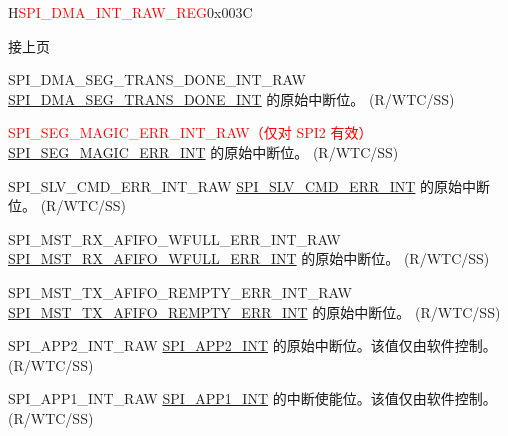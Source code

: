 \addtocounter{Regfloat}{-1}
\begin{register}{H}{\textcolor{red}{SPI\_DMA\_INT\_RAW\_REG}}{0x{}003C}
\begin{regdesc}\begin{reglist}
\item [接上页]
\label{fielddesc:SPIDMASEGTRANSDONEINTRAW}\item [SPI\_DMA\_SEG\_TRANS\_DONE\_INT\_RAW] \hyperref[int:SPIDMASEGTRANSDONEINT]{SPI\_DMA\_SEG\_TRANS\_DONE\_INT} 的原始中断位。 (R/WTC/SS)
\label{fielddesc:SPISEGMAGICERRINTRAW}\item [\textcolor{red}{SPI\_SEG\_MAGIC\_ERR\_INT\_RAW（仅对 SPI2 有效）}] \hyperref[int:SPISEGMAGICERRINT]{SPI\_SEG\_MAGIC\_ERR\_INT} 的原始中断位。 (R/WTC/SS)
\label{fielddesc:SPISLVCMDERRINTRAW}\item [SPI\_SLV\_CMD\_ERR\_INT\_RAW] \hyperref[int:SPISLVCMDERRINT]{SPI\_SLV\_CMD\_ERR\_INT} 的原始中断位。 (R/WTC/SS)
\label{fielddesc:SPIMSTRXAFIFOWFULLERRINTRAW}\item [SPI\_MST\_RX\_AFIFO\_WFULL\_ERR\_INT\_RAW] \hyperref[int:SPIMSTRXAFIFOWFULLERRINT]{SPI\_MST\_RX\_AFIFO\_WFULL\_ERR\_INT} 的原始中断位。 (R/WTC/SS)
\label{fielddesc:SPIMSTTXAFIFOREMPTYERRINTRAW}\item [SPI\_MST\_TX\_AFIFO\_REMPTY\_ERR\_INT\_RAW] \hyperref[int:SPIMSTTXAFIFOREMPTYERRINT]{SPI\_MST\_TX\_AFIFO\_REMPTY\_ERR\_INT} 的原始中断位。 (R/WTC/SS)
\label{fielddesc:SPIAPP2INTRAW}\item [SPI\_APP2\_INT\_RAW] \hyperref[int:SPIAPP2INT]{SPI\_APP2\_INT} 的原始中断位。该值仅由软件控制。 (R/WTC/SS)
\label{fielddesc:SPIAPP1INTRAW}\item [SPI\_APP1\_INT\_RAW] \hyperref[int:SPIAPP1INT]{SPI\_APP1\_INT} 的中断使能位。该值仅由软件控制。 (R/WTC/SS)
\end{reglist}\end{regdesc}
\end{register}


